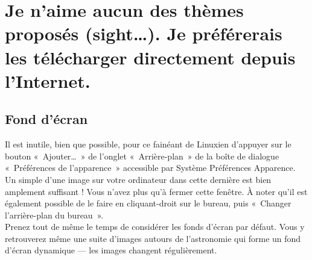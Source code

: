 \section{Je n'aime aucun des thèmes proposés (sight\ldots{}). Je préférerais les télécharger directement depuis l'Internet.}
\subsection{Fond d'écran}
Il est inutile, bien que possible, pour ce fainéant de Linuxien d'appuyer sur le bouton «~Ajouter\ldots{}~» de l'onglet «~Arrière-plan~» de la boîte de dialogue «~Préférences de l'apparence~» accessible par Système \FlecheDroite Préférences \FlecheDroite Apparence. Un simple  d'une image sur votre ordinateur dans cette dernière est bien amplement suffisant ! Vous n'avez plus qu'à fermer cette fenêtre. À noter qu'il est également possible de le faire en cliquant-droit sur le bureau, puis «~Changer l'arrière-plan du bureau~».\\
Prenez tout de même le temps de considérer les fonds d'écran par défaut. Vous y retrouverez même une suite d'images autours de l'astronomie qui forme un fond d'écran dynamique --- les images changent régulièrement.
